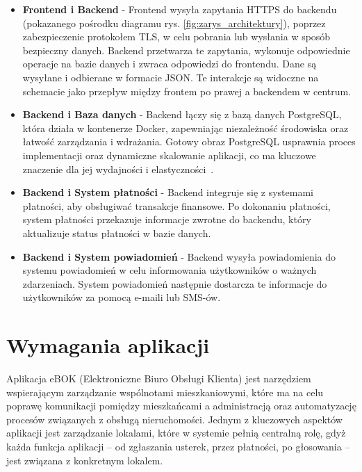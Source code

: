 \begin{itemize} 
	\item \textbf{Frontend i Backend} - Frontend wysyła zapytania HTTPS do backendu (pokazanego pośrodku diagramu rys. \ref{fig:zarys_architektury}), poprzez zabezpieczenie protokołem TLS, w celu pobrania lub wysłania w sposób bezpieczny danych. Backend przetwarza te zapytania, wykonuje odpowiednie operacje na bazie danych i zwraca odpowiedzi do frontendu. Dane są wysyłane i odbierane w formacie JSON. Te interakcje są widoczne na schemacie jako przepływ między frontem po prawej a backendem w centrum.
	
	\item \textbf{Backend i Baza danych} - Backend łączy się z bazą danych PostgreSQL, która działa w kontenerze Docker, zapewniając niezależność środowiska oraz łatwość zarządzania i wdrażania. Gotowy obraz PostgreSQL usprawnia proces implementacji oraz dynamiczne skalowanie aplikacji, co ma kluczowe znaczenie dla jej wydajności i elastyczności~\cite{Docker-docs,vsupalov}.

	\item \textbf{Backend i System płatności} - Backend integruje się z systemami płatności, aby obsługiwać transakcje finansowe. Po dokonaniu płatności, system płatności przekazuje informacje zwrotne do backendu, który aktualizuje status płatności w bazie danych.

	\item \textbf{Backend i System powiadomień} - Backend wysyła powiadomienia do systemu powiadomień w celu informowania użytkowników o ważnych zdarzeniach. System powiadomień następnie dostarcza te informacje do użytkowników za pomocą e-maili lub SMS-ów.

\end{itemize}


\section{Wymagania aplikacji}

Aplikacja eBOK (Elektroniczne Biuro Obsługi Klienta) jest narzędziem wspierającym zarządzanie wspólnotami mieszkaniowymi, które ma na celu poprawę komunikacji pomiędzy mieszkańcami a administracją oraz automatyzację procesów związanych z obsługą nieruchomości. Jednym z kluczowych aspektów aplikacji jest zarządzanie lokalami, które w systemie pełnią centralną rolę, gdyż każda funkcja aplikacji – od zgłaszania usterek, przez płatności, po głosowania – jest związana z konkretnym lokalem.

